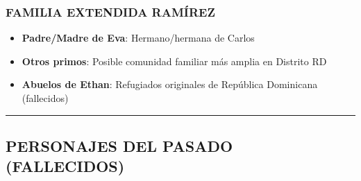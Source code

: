 \documentclass[11pt,a4paper]{report}
\begin{document}
\subsubsection{FAMILIA EXTENDIDA RAMÍREZ}
\begin{itemize}
  \item \textbf{Padre/Madre de Eva}: Hermano/hermana de Carlos
  \item \textbf{Otros primos}: Posible comunidad familiar más amplia en Distrito RD
  \item \textbf{Abuelos de Ethan}: Refugiados originales de República Dominicana (fallecidos)

\end{itemize}
\bigskip\hrule\bigskip

\subsection{PERSONAJES DEL PASADO (FALLECIDOS)}
\end{document}
